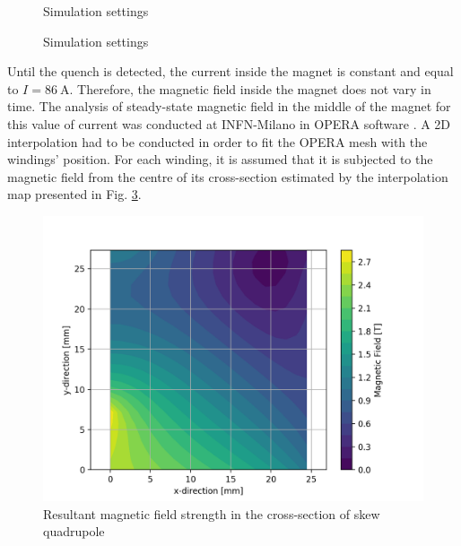 \begin{figure}[H]
\centering
{}
\caption{Simulation settings}
\label{fig:sim_settings_3}
\end{figure}

\begin{figure}[H]
\centering
{}
\caption{Simulation settings}
\label{fig:sim_settings_1}
\end{figure}



Until the quench is detected, the current inside the magnet is constant and equal to $I=86~\text{A}$. Therefore, the magnetic field inside the magnet does not vary in time. The analysis of steady-state magnetic field in the middle of the magnet for this value of current was conducted at INFN-Milano in OPERA software \cite{samuele_mariotto_mails}. A 2D interpolation had to be conducted in order to fit the OPERA mesh with the windings' position. For each winding, it is assumed that it is subjected to the magnetic field from the centre of its cross-section estimated by the interpolation map presented in Fig. \ref{fig:Quad_Mag_contour1}.

\begin{figure}[H]
    \centering
    \includegraphics[width=0.49\linewidth]{figures/skew_quad_bcs/magnetic_field_mapping/Quadrupole_Magnetic_Colour_plot.png}
    \caption{Resultant magnetic field strength in the cross-section of skew quadrupole}
    \label{fig:Quad_Mag_contour1}
\end{figure}